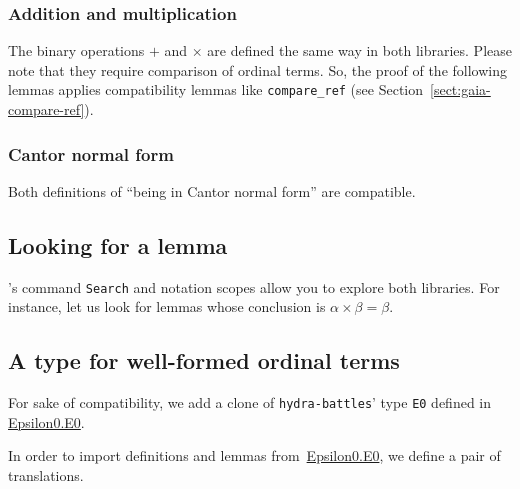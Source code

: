 


\subsubsection{Addition and multiplication}

The binary operations $+$ and $\times$ are defined the same way in both libraries. Please note that they require comparison of ordinal terms. So, the proof of the following lemmas applies
compatibility lemmas like \texttt{compare\_ref} (see Section~\vref{sect:gaia-compare-ref}).




\subsubsection{Cantor normal form}
\label{nf-gaia-compat}
Both definitions of ``being in Cantor normal form'' are
compatible.




\subsection{Looking for a lemma}
\coq's command \texttt{Search} and notation scopes allow you to explore both libraries.
For instance, let us look for lemmas whose conclusion is
$\alpha \times \beta=\beta$.



\subsection{A type for well-formed ordinal terms}

For sake of compatibility, we add a clone of \texttt{hydra-battles}' type \texttt{E0} defined in \href{../theories/html/hydras.Epsilon0.E0.html}{Epsilon0.E0}.




In order to import definitions and lemmas
from~\href{../theories/html/hydras.Epsilon0.E0.html}{Epsilon0.E0}, we define a pair of translations.

